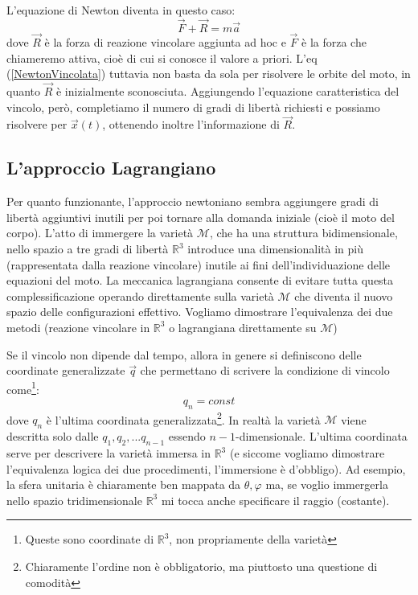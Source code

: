 \documentclass[a4paper,openany]{article}
\begin{document}
	L'equazione di Newton diventa in questo caso:
	\begin{equation}
		\vec{F} + \vec{R} = m\vec{a}
		\label{NewtonVincolata}
	\end{equation}
	dove $\vec{R}$ è la forza di reazione vincolare aggiunta ad hoc e $\vec{F}$ è la forza che chiameremo attiva, cioè di cui si conosce il valore a priori. L'eq (\ref{NewtonVincolata}) tuttavia non basta da sola per risolvere le orbite del moto, in quanto $\vec{R}$ è inizialmente sconosciuta. Aggiungendo l'equazione caratteristica del vincolo, però, completiamo il numero di gradi di libertà richiesti e possiamo risolvere per $\vec{x}(t)$, ottenendo inoltre l'informazione di $\vec{R}$.
	\subsection{L'approccio Lagrangiano}
	Per quanto funzionante, l'approccio newtoniano sembra aggiungere gradi di libertà aggiuntivi inutili per poi tornare alla domanda iniziale (cioè il moto del corpo). L'atto di immergere la varietà $\mathcal{M}$, che ha una struttura bidimensionale, nello spazio a tre gradi di libertà $\mathbb{R}^{3}$ introduce una dimensionalità in più (rappresentata dalla reazione vincolare) inutile ai fini dell'individuazione delle equazioni del moto. La meccanica lagrangiana consente di evitare tutta questa complessificazione operando direttamente sulla varietà $\mathcal{M}$ che diventa il nuovo spazio delle configurazioni effettivo. Vogliamo dimostrare l'equivalenza dei due metodi (reazione vincolare in $\mathbb{R}^3$ o lagrangiana direttamente su $\mathcal{M}$)
	
	Se il vincolo non dipende dal tempo, allora in genere si definiscono delle coordinate generalizzate $\vec{q}$ che permettano di scrivere la condizione di vincolo come\footnote{Queste sono coordinate di $\mathbb{R}^3$, non propriamente della varietà}:
	\begin{equation}
		q_{n} = const
	\end{equation}
	dove $q_n$ è l'ultima coordinata generalizzata\footnote{Chiaramente l'ordine non è obbligatorio, ma piuttosto una questione di comodità}. In realtà la varietà $\mathcal{M}$ viene descritta solo dalle $q_1, q_2, ... q_{n-1}$ essendo $n-1$-dimensionale. L'ultima coordinata serve per descrivere la varietà immersa in $\mathbb{R}^3$ (e siccome vogliamo dimostrare l'equivalenza logica dei due procedimenti, l'immersione è d'obbligo). Ad esempio, la sfera unitaria è chiaramente ben mappata da $\theta,\varphi$ ma, se voglio immergerla nello spazio tridimensionale $\mathbb{R}^3$ mi tocca anche specificare il raggio (costante).
	
\end{document}
